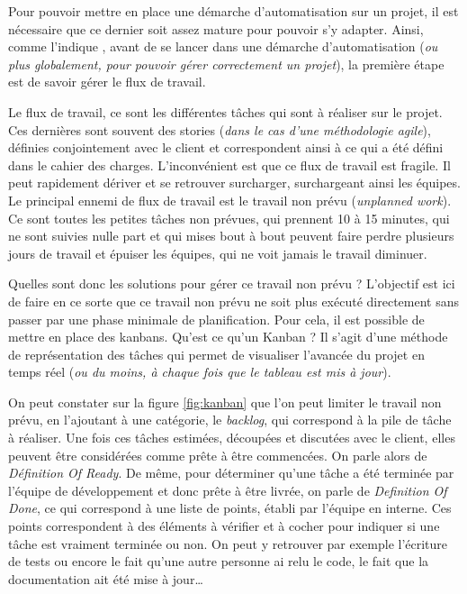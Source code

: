 Pour pouvoir mettre en place une démarche d'automatisation sur un projet, il est nécessaire que ce dernier soit assez mature pour pouvoir s'y adapter. Ainsi, comme l'indique  \cite{phoenixProject},  avant de se lancer dans une démarche d'automatisation (\emph{ou plus globalement, pour pouvoir gérer correctement un projet}), la première étape est de savoir gérer le flux de travail.

Le flux de travail, ce sont les différentes tâches qui sont à réaliser sur le projet. Ces dernières sont souvent des stories (\emph{dans le cas d'une méthodologie agile}), définies conjointement avec le client et correspondent ainsi à ce qui a été défini dans le cahier des charges. L'inconvénient est que ce flux de travail est fragile. Il peut rapidement dériver et se retrouver surcharger, surchargeant ainsi les équipes. Le principal ennemi de flux de travail est le travail non prévu (\emph{unplanned work}). Ce sont toutes les petites tâches non prévues, qui prennent 10 à 15 minutes, qui ne sont suivies nulle part et qui mises bout à bout peuvent faire perdre plusieurs jours de travail et épuiser les équipes, qui ne voit jamais le travail diminuer.

Quelles sont donc les solutions pour gérer ce travail non prévu ? L'objectif est ici de faire en ce sorte que ce travail non prévu ne soit plus exécuté directement sans passer par une phase minimale de planification. Pour cela, il est possible de mettre en place des kanbans. Qu'est ce qu'un Kanban ? Il s'agit d'une méthode de représentation des tâches qui permet de visualiser l'avancée du projet en temps réel (\emph{ou du moins, à chaque fois que le tableau est mis à jour}). 


On peut constater sur la figure \ref{fig:kanban} que l'on peut limiter le travail non prévu, en l'ajoutant à une catégorie, le \emph{backlog}, qui correspond à la pile de tâche à réaliser. Une fois ces tâches estimées, découpées et discutées avec le client, elles peuvent être considérées comme prête à être commencées. On parle alors de \emph{Définition Of Ready}. De même, pour déterminer qu'une tâche a été terminée par l'équipe de développement et donc prête à être livrée, on parle de \emph{Definition Of Done}, ce qui correspond à une liste de points, établi par l'équipe en interne. Ces points correspondent à des éléments à vérifier et à cocher pour indiquer si une tâche est vraiment terminée ou non. On peut y retrouver par exemple l'écriture de tests ou encore le fait qu'une autre personne ai relu le code, le fait que la documentation ait été mise à jour\ldots


